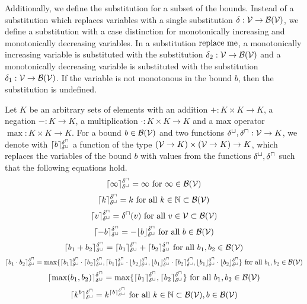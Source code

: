 Additionally, we define the substitution for a subset of the bounds.
Instead of a substitution which replaces variables with a single substitution $\delta: \VSet \rightarrow \BoundSet(\VSet)$, we define a substitution with a case distinction for monotonically increasing and monotonically decreasing variables.
In a substitution $\apprsubst{b}{\delta_1}{\delta_2}$, a monotonically increasing variable is substituted with the substitution $\delta_2: \VSet \rightarrow \BoundSet(\VSet)$ and a monotonically decreasing variable is substituted with the substitution $\delta_1: \VSet \rightarrow \BoundSet(\VSet)$.
If the variable is not monotonous in the bound $b$, then the substitution is undefined.
\begin{definition}
  Let $K$ be an arbitrary sets of elements with an addition $+: K \times K \rightarrow K$, a negation $-: K \rightarrow K$, a multiplication $\cdot: K \times K \rightarrow K$ and a max operator $\max: K \times K \rightarrow K$.
  For a bound $b \in \BoundSet(\VSet)$ and two functions $\lsub, \usub: \VSet \rightarrow K$, we denote with $\oversubst{b}{\lsub}{\usub}$ a function of the type $(\VSet \rightarrow K) \times (\VSet \rightarrow K) \rightarrow K$, which replaces the variables of the bound $b$ with values from the functions $\lsub, \usub$ such that the following equations hold.
  \[ \oversubst{\infty}{\lsub}{\usub} = \infty \text{ for } \infty \in \BoundSet(\VSet) \]
  \[ \oversubst{k}{\lsub}{\usub} = k \text{ for all } k \in \mathbb{N} \subset \BoundSet(\VSet) \] 
  \[ \oversubst{v}{\lsub}{\usub} = \usub(v) \text{ for all } v \in \VSet \subset \BoundSet(\VSet) \] 
  \[ \oversubst{-b}{\lsub}{\usub} = -\undersubst{b}{\lsub}{\usub} \text{ for all } b \in \BoundSet(\VSet) \] 
  \[ \oversubst{b_1 + b_2}{\lsub}{\usub} = \oversubst{b_1}{\lsub}{\usub} + \oversubst{b_2}{\lsub}{\usub} \text{ for all } b_1, b_2 \in \BoundSet(\VSet) \] 
  \[ \oversubst{b_1 \cdot b_2}{\lsub}{\usub} = \maximum{
    \oversubst{b_1}{\lsub}{\usub} \cdot \oversubst{b_2}{\lsub}{\usub},
    \oversubst{b_1}{\lsub}{\usub} \cdot \undersubst{b_2}{\lsub}{\usub},
    \undersubst{b_1}{\lsub}{\usub} \cdot \oversubst{b_2}{\lsub}{\usub},
    \undersubst{b_1}{\lsub}{\usub} \cdot \undersubst{b_2}{\lsub}{\usub}
  } \text{ for all } b_1, b_2 \in \BoundSet(\VSet) \] 
  \[ \oversubst{\max(b_1, b_2)}{\lsub}{\usub} = \maximum{\oversubst{b_1}{\lsub}{\usub}, \oversubst{b_2}{\lsub}{\usub}} \text{ for all } b_1, b_2 \in \BoundSet(\VSet) \]
  \[ \oversubst{k^b}{\lsub}{\usub} = k^{\oversubst{b}{\lsub}{\usub}} \text{ for all } k \in \mathbb{N} \subset \BoundSet(\VSet), b \in \BoundSet(\VSet) \]  
\end{definition}

